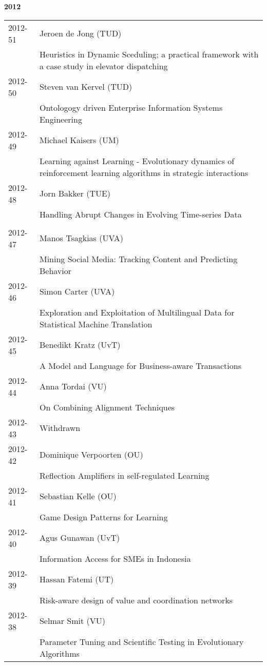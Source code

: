 \begin{center}
	\large{\textbf{2012}}
\end{center}

\begin{longtable}{p{1.25cm}p{10.75cm}}
2012-51 & Jeroen de Jong (TUD) \\& Heuristics in Dynamic Sceduling; a practical framework with a case study in elevator dispatching \\
2012-50 & Steven van Kervel (TUD) \\& Ontologogy driven Enterprise Information Systems Engineering \\
2012-49 & Michael Kaisers (UM) \\& Learning against Learning - Evolutionary dynamics of reinforcement \newline learning algorithms in strategic interactions \\
2012-48 & Jorn Bakker (TUE) \\& Handling Abrupt Changes in Evolving Time-series Data \\
\\
2012-47 & Manos Tsagkias (UVA) \\& Mining Social Media: Tracking Content and Predicting Behavior \\
2012-46 & Simon Carter (UVA) \\& Exploration and Exploitation of Multilingual Data for Statistical Machine Translation \\
2012-45 & Benedikt Kratz (UvT) \\& A Model and Language for Business-aware Transactions \\
2012-44 & Anna Tordai (VU) \\& On Combining Alignment Techniques \\
2012-43 & Withdrawn \\
2012-42 & Dominique Verpoorten (OU) \\& Reflection Amplifiers in self-regulated Learning \\
2012-41 & Sebastian Kelle (OU) \\& Game Design Patterns for Learning \\
2012-40 & Agus Gunawan (UvT) \\& Information Access for SMEs in Indonesia \\
2012-39 & Hassan Fatemi (UT) \\& Risk-aware design of value and coordination networks \\
2012-38 & Selmar Smit (VU) \\& Parameter Tuning and Scientific Testing in Evolutionary Algorithms \\

\end{longtable}
